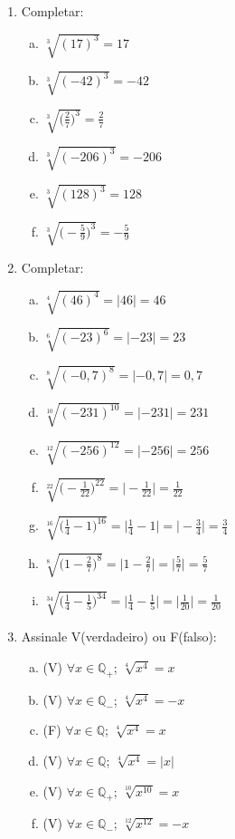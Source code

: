 \documentclass[a4paper,14pt]{article}
\begin{document}
\begin{multicols}{2}
\begin{enumerate}
\begin{enumerate}[a)]
	    \end{enumerate}
    
        \item Completar:
		\begin{enumerate}[a)]
        	\item $\sqrt[3]{(17)^3} = 17$
        	\item $\sqrt[3]{(-42)^3} = -42$
        	\item $\sqrt[3]{\bigg( \frac{2}{7} \bigg)^3 } = \frac{2}{7}$
        	\item $\sqrt[3]{(-206)^3} = -206$
        	\item $\sqrt[3]{(128)^3} = 128$
        	\item $\sqrt[3]{\bigg(- \frac{5}{9} \bigg)^3 } = -\frac{5}{9}$
        \end{enumerate}
        \item Completar:
        \begin{enumerate}[a)]
        	\item $\sqrt[4]{(46)^4} = |46| = 46$
        	\item $\sqrt[6]{(-23)^6} = |-23| = 23$
        	\item $\sqrt[8]{(-0,7)^8} = |-0,7| = 0,7$
        	\item $\sqrt[10]{(-231)^{10}} = |-231| = 231$
        	\item $\sqrt[12]{(-256)^{12}} = |-256| = 256$
        	\item $\sqrt[22]{\bigg(- \frac{1}{22} \bigg)^{22} } = \bigg| - \frac{1}{22} \bigg| = \frac{1}{22}$
        	\item $\sqrt[16]{\bigg( \frac{1}{4}-1 \bigg)^{16} } = \bigg| \frac{1}{4} - 1 \bigg| = \bigg| -\frac{3}{4} \bigg| = \frac{3}{4}$
        	\item $\sqrt[8]{\bigg( 1 - \frac{2}{7} \bigg)^8 } = \bigg| 1 - \frac{2}{7}\bigg| = \bigg| \frac{5}{7} \bigg| = \frac{5}{7}$ 
        	\item $\sqrt[34]{\bigg( \frac{1}{4} - \frac{1}{5} \bigg)^{34} } = \bigg| \frac{1}{4} - \frac{1}{5} \bigg| = \bigg| \frac{1}{20} \bigg| = \frac{1}{20}$
        \end{enumerate}
        \item Assinale V(verdadeiro) ou F(falso):
        \begin{enumerate}[a)]
        	\item (V) $\forall x \in \mathbb{Q_+}$; $\sqrt[4]{x^4} = x$
        	\item (V) $\forall x \in \mathbb{Q_-}$; $\sqrt[4]{x^4} = -x$
        	\item (F) $\forall x \in \mathbb{Q}$; $\sqrt[4]{x^4} = x$
        	\item (V) $\forall x \in \mathbb{Q}$; $\sqrt[4]{x^4} = |x|$
        	\item (V) $\forall x \in \mathbb{Q_+}$; $\sqrt[10]{x^{10}} = x$
        	\item (V) $\forall x \in \mathbb{Q_-}$; $\sqrt[12]{x^{12}} = -x$
        \end{enumerate}        
    \end{enumerate}        
    \end{multicols}    
\end{document}
